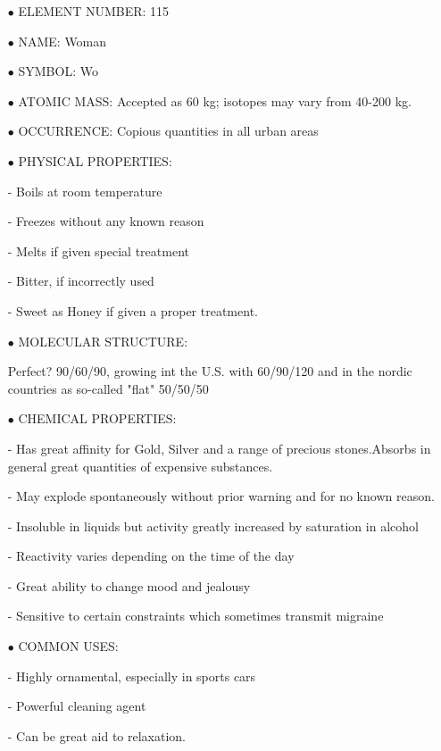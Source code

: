 \begin{itemize}
	\item[$\bullet$] ELEMENT NUMBER: 115

	\item[$\bullet$]NAME: Woman

	\item[$\bullet$] SYMBOL: Wo

	\item[$\bullet$] ATOMIC MASS: Accepted as 60 kg; isotopes may vary from 40-200 kg.

	\item[$\bullet$] OCCURRENCE: Copious quantities in all urban areas

	\item[$\bullet$] PHYSICAL PROPERTIES:

- Boils at room temperature

- Freezes without any known reason

- Melts if given special treatment

- Bitter, if incorrectly used

- Sweet as Honey if given a proper treatment.

	\item[$\bullet$] MOLECULAR STRUCTURE:

Perfect? 90/60/90, growing int the U.S. with 60/90/120 and in the nordic countries as so-called "flat" 50/50/50

	\item[$\bullet$] CHEMICAL PROPERTIES:

- Has great affinity for Gold, Silver and a range of precious stones.Absorbs in general great quantities of expensive substances.

- May explode spontaneously without prior warning and for no known reason.

- Insoluble in liquids but activity greatly increased by saturation in alcohol

- Reactivity varies depending on the time of the day

- Great ability to change mood and jealousy

- Sensitive to certain constraints which sometimes transmit migraine

	\item[$\bullet$] COMMON USES: 

- Highly ornamental, especially in sports cars

- Powerful cleaning agent

- Can be great aid to relaxation.


\end{itemize}
